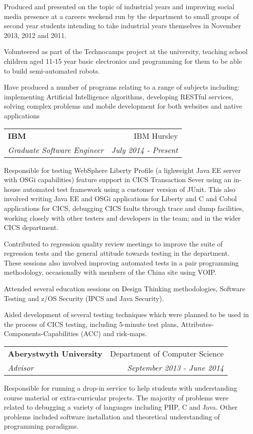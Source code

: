 \documentclass[letterpaper,11pt]{article}
\makeatletter
\newlength{\outerbordwidth}
\newcommand{\resheading}[1]{\vspace{8pt}
  \parbox{\textwidth}{\setlength{\FrameSep}{\outerbordwidth}
    \begin{shaded}
\setlength{\fboxsep}{0pt}\framebox[\textwidth][l]{\setlength{\fboxsep}{4pt}\fcolorbox{shadecolorB}{shadecolorB}{\textbf{\sffamily{\mbox{~}\makebox[6.762in][l]{\large #1} \vphantom{p\^{E}}}}}}
    \end{shaded}
  }\vspace{-5pt}
}
\newcommand{\ressubheading}[4]{
\vspace{10pt}
\begin{tabular*}{6.5in}{l@{\cftdotfill{\cftsecdotsep}\extracolsep{\fill}}r}
		\textbf{#1} & #2 \\
		\textit{#3} & \textit{#4} \\
\end{tabular*}\vspace{-6pt}
\vspace{10pt}}
\makeatother
\begin{document}
Produced and presented on the topic of industrial years and improving social
media presence at a careers weekend run by the department to small groups of
second year students intending to take industrial years themselves in November
2013, 2012 and 2011.

Volunteered as part of the Technocamps project at the university, teaching 
school children aged 11-15 year basic electronics and programming for them to 
be able to build semi-automated robots.

Have produced a number of programs relating to a range of subjects including: 
implementing Artificial Intelligence algorithms, developing RESTful services,
solving complex problems and mobile development for both websites and native 
applications


\resheading{Work Experience}

\ressubheading{IBM}{IBM Hursley}{Graduate Software Engineer}{July 2014 -
Present}

Responsible for testing WebSphere Liberty Profile (a lighweight Java EE server
with OSGi capabilities) feature support in CICS Transaction Sever using an
in-house automated test framework using a customer version of JUnit. This
also involved writing Java EE and OSGi applications for Liberty and C and Cobol
applications for CICS, debugging CICS faults through trace and dump facilities,
working closely with other testers and developers in the team; and in the wider
CICS department.

Contributed to regression quality review meetings to improve the suite of
regression tests and the general attitude towards testing in the department.
These sessions also involved improving automated tests in a pair programming
methodology, occasionally with members of the China site using VOIP.

Attended several education sessions on Design Thinking methodologies, Software
Testing and z/OS Security (IPCS and Java Security).

Aided development of several testing techniques which were planned to be used
in the process of CICS testing, including 5-minute test plans,
Attributes-Components-Capabilities (ACC) and risk-maps.

\ressubheading{Aberystwyth University}{Department of Computer Science}{Advisor}
{September 2013 - June 2014}

Responsible for running a drop-in service to help students with understanding
course material or extra-curricular projects. The majority of problems were
related to debugging a variety of languages including PHP, C and Java. Other
problems included software installation and theoretical understanding of 
programming paradigms.
\end{document}
